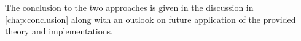 The conclusion to the two approaches is given in the discussion in \autoref{chap:conclusion} along with an outlook on future application of the provided theory and implementations.





